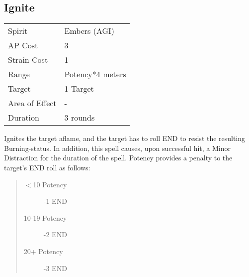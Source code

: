 \documentclass[11pt,a4paper,twocolumn]{book}
\begin{document}
%	
%
%
%

\subsection*{Ignite}
{
	\begin{tabu} to 70mm{| X[l,4] | X[l,7] |}
		\hline
		Spirit         & Embers (AGI)     \\
		AP Cost        & 3                \\
		Strain Cost    & 1                \\
		Range          & Potency*4 meters \\
		Target         & 1 Target         \\
		Area of Effect & -                \\
		Duration       & 3 rounds         \\ \hline
	\end{tabu}
	
}
\medskip

Ignites the target aflame, and the target has to roll END to resist the resulting Burning-status. In addition, this spell causes, upon successful hit, a Minor Distraction for the duration of the spell. Potency provides a penalty to the target's END roll as follows:
\begin{quote}
	\begin{description}
		\item[$<$10 Potency] 	-1 END
		\item[10-19 Potency] 	-2 END
		\item[20+ Potency]  	-3 END
	\end{description}	
\end{quote}
\end{document}
